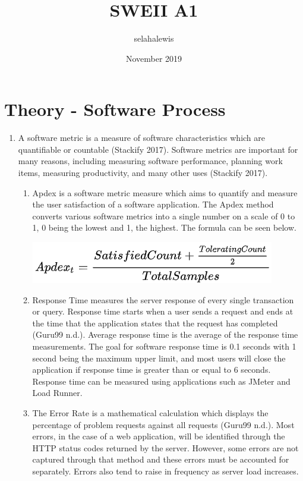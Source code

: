 \documentclass{article}
\title{SWEII A1}
\author{selahalewis }
\date{November 2019}
\begin{document}
\maketitle

\section{Theory - Software Process}
\begin{enumerate}

   \item A software metric is a measure of software characteristics which are quantifiable or countable (Stackify 2017). Software metrics are important for many reasons, including measuring software performance, planning work items, measuring productivity, and many other uses (Stackify 2017).
   \begin{enumerate}
       \item Apdex is a software metric measure which aims to quantify and measure the user satisfaction of a software application. The Apdex method converts various software metrics into a single number on a scale of 0 to 1, 0 being the lowest and 1, the highest. The formula can be seen below.\newline
       
       \includegraphics{images/sjGUFG.png}
       
       \item Response Time measures the server response of every single transaction or query. Response time starts when a user sends a request and ends at the time that the application states that the request has completed (Guru99 n.d.). Average response time is the average of the response time measurements. The goal for software response time is 0.1 seconds with 1 second being the maximum upper limit, and most users will close the application if response time is greater than or equal to 6 seconds. Response time can be measured using applications such as JMeter and Load Runner.
       
        \item The Error Rate is a mathematical calculation which displays the percentage of problem requests against all requests (Guru99 n.d.). Most errors, in the case of a web application, will be identified through the HTTP status codes returned by the server. However, some errors are not captured through that method and these errors must be accounted for separately. Errors also tend to raise in frequency as server load increases.


\end{enumerate}
\end{enumerate}
\end{document}
